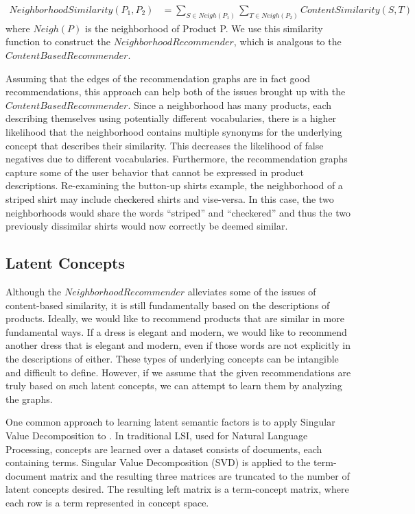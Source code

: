 \documentclass[11pt]{article}
\begin{document}
\begin{align}
NeighborhoodSimilarity(P_1, P_2) &= \sum\limits_{S\in
Neigh(P_1)}\sum\limits_{T\in Neigh(P_2)}
ContentSimilarity(S, T) 
\end{align}
where $Neigh(P)$ is the neighborhood of Product P. We use this similarity
function to construct the $Neighborhood Recommender$, which is analgous to the
$ContentBased Recommender$.

Assuming that the edges of the recommendation graphs are in fact good
recommendations, this approach can help both of the issues brought up with the
$ContentBased Recommender$. Since a neighborhood has many products, each 
describing themselves using potentially different vocabularies, there is a 
higher likelihood that the neighborhood contains multiple synonyms for the
underlying concept that describes their similarity. This decreases the
likelihood of false negatives due to different vocabularies. Furthermore,
the recommendation graphs capture some of the user behavior that cannot be
expressed in product descriptions. Re-examining the button-up shirts example, 
the neighborhood of a striped shirt may include checkered shirts and vise-versa.
In this case, the two neighborhoods would share the words ``striped'' and 
``checkered'' and thus the two previously dissimilar shirts would now correctly
be deemed similar.

\subsection*{Latent Concepts}
Although the $Neighborhood Recommender$ alleviates some of the issues of 
content-based similarity, it is still fundamentally based on the descriptions of
products. Ideally, we would like to recommend products that are similar in more
fundamental ways. If a dress is elegant and modern, we would like to recommend 
another dress that is elegant and modern, even if those words are not explicitly
in the descriptions of either. These types of underlying concepts can be 
intangible and difficult to define. However, if we assume that the given
recommendations are truly based on such latent concepts, we can attempt to learn 
them by analyzing the graphs.

One common approach to learning latent semantic factors is to apply Singular Value
Decomposition to . In
traditional LSI, used for Natural Language Processing, concepts are learned over 
a dataset consists of documents, each containing terms. Singular Value 
Decomposition (SVD) is applied to the term-document matrix and the resulting 
three matrices are truncated to the number of latent concepts desired. The 
resulting left matrix is a term-concept matrix, where each row is a term 
represented in concept space.
\end{document}

